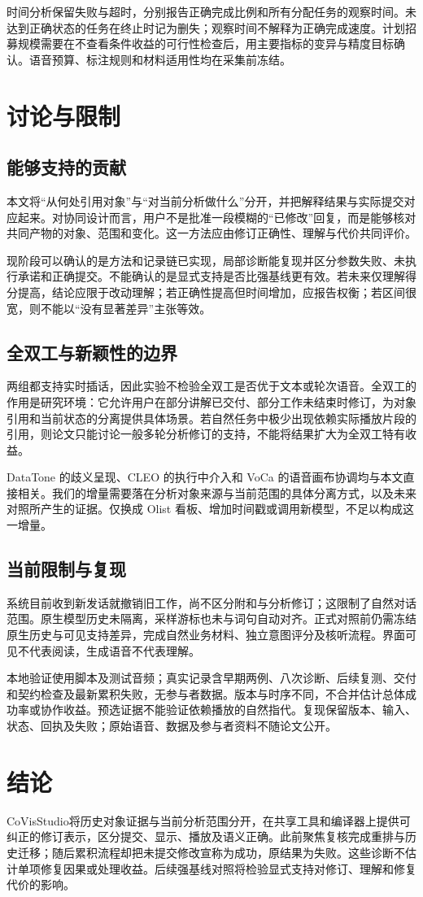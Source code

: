 \documentclass[conference]{IEEEtran}
\newcommand{\sys}{CoVisStudio}
\begin{document}
时间分析保留失败与超时，分别报告正确完成比例和所有分配任务的观察时间。未达到正确状态的任务在终止时记为删失；观察时间不解释为正确完成速度。计划招募规模需要在不查看条件收益的可行性检查后，用主要指标的变异与精度目标确认。语音预算、标注规则和材料适用性均在采集前冻结。

\section{讨论与限制}
\subsection{能够支持的贡献}
本文将“从何处引用对象”与“对当前分析做什么”分开，并把解释结果与实际提交对应起来。对协同设计而言，用户不是批准一段模糊的“已修改”回复，而是能够核对共同产物的对象、范围和变化。这一方法应由修订正确性、理解与代价共同评价。

现阶段可以确认的是方法和记录链已实现，局部诊断能复现并区分参数失败、未执行承诺和正确提交。不能确认的是显式支持是否比强基线更有效。若未来仅理解得分提高，结论应限于改动理解；若正确性提高但时间增加，应报告权衡；若区间很宽，则不能以“没有显著差异”主张等效。

\subsection{全双工与新颖性的边界}
两组都支持实时插话，因此实验不检验全双工是否优于文本或轮次语音。全双工的作用是研究环境：它允许用户在部分讲解已交付、部分工作未结束时修订，为对象引用和当前状态的分离提供具体场景。若自然任务中极少出现依赖实际播放片段的引用，则论文只能讨论一般多轮分析修订的支持，不能将结果扩大为全双工特有收益。

DataTone 的歧义呈现、CLEO 的执行中介入和 VoCa 的语音画布协调均与本文直接相关。我们的增量需要落在分析对象来源与当前范围的具体分离方式，以及未来对照所产生的证据。仅换成 Olist 看板、增加时间戳或调用新模型，不足以构成这一增量。

\subsection{当前限制与复现}
系统目前收到新发话就撤销旧工作，尚不区分附和与分析修订；这限制了自然对话范围。原生模型历史未隔离，采样游标也未与词句自动对齐。正式对照前仍需冻结原生历史与可见支持差异，完成自然业务材料、独立意图评分及核听流程。界面可见不代表阅读，生成语音不代表理解。

本地验证使用脚本及测试音频；真实记录含早期两例、八次诊断、后续复测、交付和契约检查及最新累积失败，无参与者数据。版本与时序不同，不合并估计总体成功率或协作收益。预选证据不能验证依赖播放的自然指代。复现保留版本、输入、状态、回执及失败；原始语音、数据及参与者资料不随论文公开。

\section{结论}
\sys 将历史对象证据与当前分析范围分开，在共享工具和编译器上提供可纠正的修订表示，区分提交、显示、播放及语义正确。此前聚焦复核完成重排与历史迁移；随后累积流程却把未提交修改宣称为成功，原结果为失败。这些诊断不估计单项修复因果或处理收益。后续强基线对照将检验显式支持对修订、理解和修复代价的影响。

\balance


\end{document}
